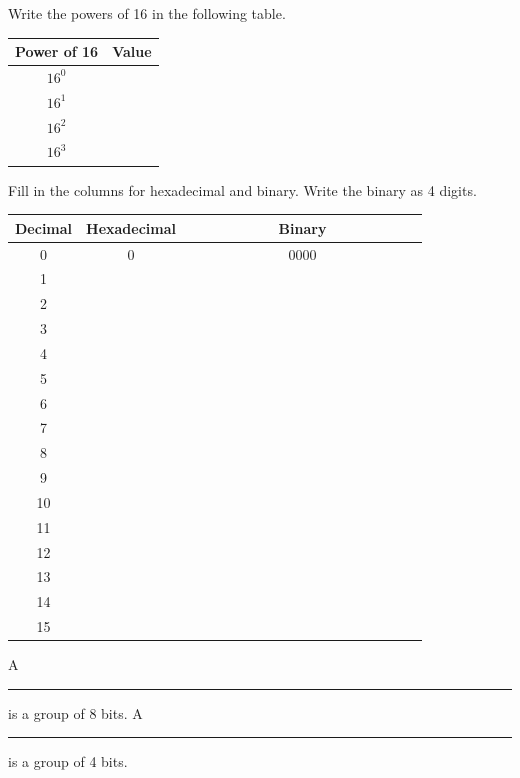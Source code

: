 \documentclass[letterpaper,12pt]{exam}
\begin{document}
\begin{questions}
\begin{samepage}
    \question Write the powers of 16 in the following table.
\par
    \begin{Large}
\begin{tabular}{| c | c |}

 \hline
    Power of 16& Value \\
    \hline
 $16^0 $ &  \\
 \hline 
$16^1 $ &  \\
 \hline 
$16^2 $ &  \\
 \hline 
$16^3 $ &  \\
 \hline 
\end{tabular}
\end{Large}
\end{samepage}

\begin{samepage}
    \question Fill in the columns for hexadecimal and binary.  Write the binary as 4 digits.
 \par
 \begin{large}
    \begin{tabular}{| c | c | c |}
    \hline
        Decimal & Hexadecimal & \ \ \ \ \ \ \ \ \ \ \ Binary\ \ \ \ \ \ \ \ \ \ \ \\
        \hline
    0 & 0 & 0000 \\ 
    1 &  &  \\  
\hline
    2 &  & \  \\ 
    3 &  & \  \\  
\hline
    4 &  & \  \\ 
    5 &  & \  \\  
\hline
    6 &  & \  \\ 
    7 &  & \  \\  
\hline
    8 &  & \  \\ 
    9 &  & \  \\  
\hline
    10 &  & \  \\ 
    11 &  & \  \\  
\hline
    12 &  & \  \\ 
    13 &  & \  \\  
\hline
    14 &  & \  \\ 
    15 &  & \  \\  
\hline
\end{tabular}
\end{large}
\end{samepage}
\par
 
\begin{samepage}
    \question A \rule{2cm}{0.15mm} is a group of 8 bits.  A \rule{3cm}{0.15mm} is a group of 4 bits.
    \vspace{5mm}
\end{samepage}
\par
 

\end{questions}
\end{document}
